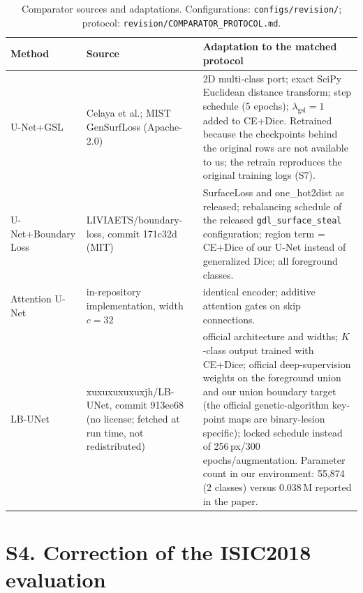 \documentclass[10pt]{article}
\begin{document}
\begin{table}[ht]\centering\small
\begin{tabular}{p{2.6cm}p{4.5cm}p{8.2cm}}
\toprule
Method & Source & Adaptation to the matched protocol \\
\midrule
U-Net+GSL & Celaya et al.; MIST GenSurfLoss (Apache-2.0) & 2D multi-class port; exact SciPy Euclidean distance transform; step schedule (5 epochs); $\lambda_{\mathrm{gsl}}=1$ added to CE+Dice. Retrained because the checkpoints behind the original rows are not available to us; the retrain reproduces the original training logs (S7). \\
U-Net+Boundary Loss & LIVIAETS/boundary-loss, commit 171c32d (MIT) & SurfaceLoss and one\_hot2dist as released; rebalancing schedule of the released \texttt{gdl\_surface\_steal} configuration; region term = CE+Dice of our U-Net instead of generalized Dice; all foreground classes. \\
Attention U-Net & in-repository implementation, width $c=32$ & identical encoder; additive attention gates on skip connections. \\
LB-UNet & xuxuxuxuxuxjh/LB-UNet, commit 913ee68 (no license; fetched at run time, not redistributed) & official architecture and widths; $K$-class output trained with CE+Dice; official deep-supervision weights on the foreground union and our union boundary target (the official genetic-algorithm key-point maps are binary-lesion specific); locked schedule instead of 256\,px/300 epochs/augmentation. Parameter count in our environment: 55,874 (2 classes) versus 0.038\,M reported in the paper. \\
\bottomrule
\end{tabular}
\caption{Comparator sources and adaptations. Configurations: \texttt{configs/revision/}; protocol: \texttt{revision/COMPARATOR\_PROTOCOL.md}.}
\end{table}

\clearpage
\section*{S4. Correction of the ISIC2018 evaluation}
\end{document}
